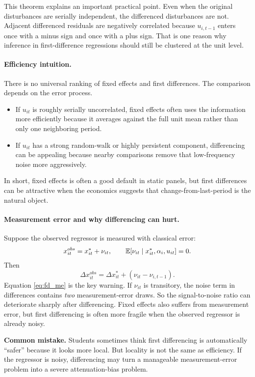 This theorem explains an important practical point. Even when the original disturbances are serially independent, the differenced disturbances are not. Adjacent differenced residuals are negatively correlated because $u_{i,t-1}$ enters once with a minus sign and once with a plus sign. That is one reason why inference in first-difference regressions should still be clustered at the unit level.

\paragraph{Efficiency intuition.}
There is no universal ranking of fixed effects and first differences. The comparison depends on the error process.
\begin{itemize}
\item If $u_{it}$ is roughly serially uncorrelated, fixed effects often uses the information more efficiently because it averages against the full unit mean rather than only one neighboring period.
\item If $u_{it}$ has a strong random-walk or highly persistent component, differencing can be appealing because nearby comparisons remove that low-frequency noise more aggressively.
\end{itemize}
In short, fixed effects is often a good default in static panels, but first differences can be attractive when the economics suggests that change-from-last-period is the natural object.

\paragraph{Measurement error and why differencing can hurt.}
Suppose the observed regressor is measured with classical error:
\[
x_{it}^{obs}=x_{it}^{\ast}+\nu_{it},
\qquad
\mathbb{E}[\nu_{it}\mid x_{it}^{\ast},\alpha_i,u_{it}]=0.
\]
Then
\begin{equation}
\Delta x_{it}^{obs}
= \Delta x_{it}^{\ast} + (\nu_{it}-\nu_{i,t-1}).
\label{eq:fd_me}
\end{equation}
Equation \eqref{eq:fd_me} is the key warning. If $\nu_{it}$ is transitory, the noise term in differences contains \emph{two} measurement-error draws. So the signal-to-noise ratio can deteriorate sharply after differencing. Fixed effects also suffers from measurement error, but first differencing is often more fragile when the observed regressor is already noisy.

\begin{boxF}
\textbf{Common mistake.}
Students sometimes think first differencing is automatically ``safer'' because it looks more local. But locality is not the same as efficiency. If the regressor is noisy, differencing may turn a manageable measurement-error problem into a severe attenuation-bias problem.
\end{boxF}

